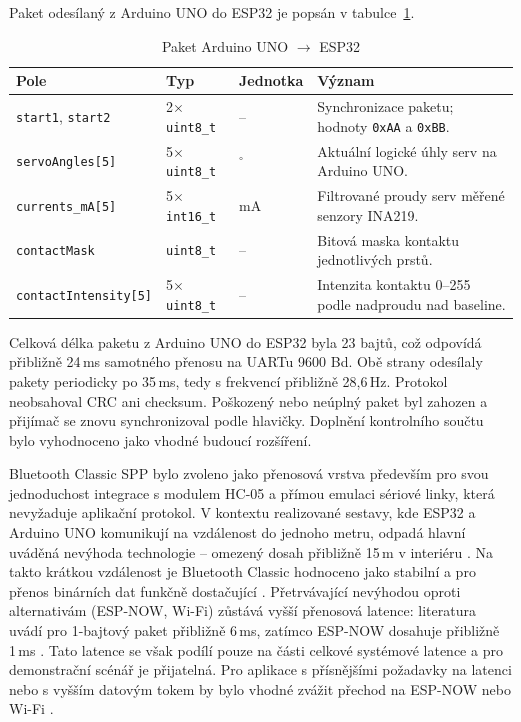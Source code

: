 \documentclass[FZS,DP]{tulthesis}
\begin{document}
Paket odesílaný z Arduino UNO do ESP32 je popsán v tabulce~\ref{tab:packet-uno-esp}.

\begin{table}[H]
\centering
\caption{Paket Arduino UNO $\rightarrow$ ESP32}
\label{tab:packet-uno-esp}
\begin{tabular}{|p{}|p{}|p{}|p{}|}
\hline
\textbf{Pole} & \textbf{Typ} & \textbf{Jednotka} & \textbf{Význam} \\
\hline
\texttt{start1}, \texttt{start2} & 2$\times$ \texttt{uint8\_t} & -- & Synchronizace paketu; hodnoty \texttt{0xAA} a \texttt{0xBB}. \\
\hline
\texttt{servoAngles[5]} & 5$\times$ \texttt{uint8\_t} & $^\circ$ & Aktuální logické úhly serv na Arduino UNO\@. \\
\hline
\texttt{currents\_mA[5]} & 5$\times$ \texttt{int16\_t} & mA & Filtrované proudy serv měřené senzory INA219. \\
\hline
\texttt{contactMask} & \texttt{uint8\_t} & -- & Bitová maska kontaktu jednotlivých prstů. \\
\hline
\texttt{contactIntensity[5]} & 5$\times$ \texttt{uint8\_t} & -- & Intenzita kontaktu 0--255 podle nadproudu nad baseline. \\
\hline
\end{tabular}
\end{table}

Celková délka paketu z Arduino UNO do ESP32 byla 23 bajtů, což odpovídá přibližně 24\,ms samotného přenosu na UARTu 9600 Bd. Obě strany odesílaly pakety periodicky po 35\,ms, tedy s frekvencí přibližně 28,6\,Hz. Protokol neobsahoval CRC ani checksum. Poškozený nebo neúplný paket byl zahozen a přijímač se znovu synchronizoval podle hlavičky. Doplnění kontrolního součtu bylo vyhodnoceno jako vhodné budoucí rozšíření.

Bluetooth Classic SPP bylo zvoleno jako přenosová vrstva především pro svou jednoduchost integrace s modulem HC-05 a přímou emulaci sériové linky, která nevyžaduje aplikační protokol. V kontextu realizované sestavy, kde ESP32 a Arduino UNO komunikují na vzdálenost do jednoho metru, odpadá hlavní uváděná nevýhoda technologie -- omezený dosah přibližně 15\,m v interiéru \cite{Eridani2021918}. Na takto krátkou vzdálenost je Bluetooth Classic hodnoceno jako stabilní a pro přenos binárních dat funkčně dostačující \cite{Eridani2021918,Kos2018}. Přetrvávající nevýhodou oproti alternativám (ESP-NOW, Wi-Fi) zůstává vyšší přenosová latence: literatura uvádí pro 1-bajtový paket přibližně 6\,ms, zatímco ESP-NOW dosahuje přibližně 1\,ms \cite{Eridani2021918}. Tato latence se však podílí pouze na části celkové systémové latence a pro demonstrační scénář je přijatelná. Pro aplikace s přísnějšími požadavky na latenci nebo s vyšším datovým tokem by bylo vhodné zvážit přechod na ESP-NOW nebo Wi-Fi \cite{Eridani2021918,Papakonstantinou20251218}.
\end{document}
